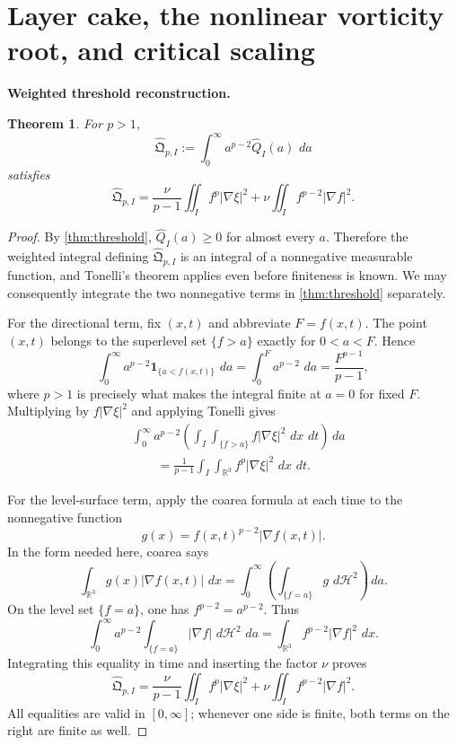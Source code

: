 \documentclass[11pt]{article}
\newtheorem{theorem}{Theorem}[section]
\theoremstyle{definition}\newtheorem{definition}[theorem]{Definition}
\theoremstyle{remark}\newtheorem{remark}[theorem]{Remark}
\newcommand{\R}{\mathbb R}\newcommand{\dd}{\,d}\newcommand{\HH}{\mathcal H}
\newcommand{\Qhat}{\widehat Q}\newcommand{\Qp}{\widehat{\mathfrak Q}}
\begin{document}
\section{Layer cake, the nonlinear vorticity root, and critical scaling}
\medskip
\noindent\textbf{Weighted threshold reconstruction.}
\begin{theorem}\label{thm:layercake}
For $p>1$,
\[
\Qp_{p,I}:=\int_0^\infty a^{p-2}\Qhat_I(a)\,\dd a
\]
satisfies
\[
\boxed{
\Qp_{p,I}=
\frac{\nu}{p-1}\iint_I f^p|\nabla\xi|^2
+\nu\iint_I f^{p-2}|\nabla f|^2.
}
\]
\end{theorem}
\begin{proof}
By \cref{thm:threshold}, $\Qhat_I(a)\ge0$ for almost every $a$.  Therefore
the weighted integral defining $\Qp_{p,I}$ is an integral of a nonnegative
measurable function, and Tonelli's theorem applies even before finiteness is
known.  We may consequently integrate the two nonnegative terms in
\cref{thm:threshold} separately.

For the directional term, fix $(x,t)$ and abbreviate $F=f(x,t)$.  The point
$(x,t)$ belongs to the superlevel set $\{f>a\}$ exactly for $0<a<F$.  Hence
\[
\int_0^\infty a^{p-2}\mathbf1_{\{a<f(x,t)\}}\,\dd a
=\int_0^F a^{p-2}\,\dd a
=\frac{F^{p-1}}{p-1},
\]
where $p>1$ is precisely what makes the integral finite at $a=0$ for fixed
$F$.  Multiplying by $f|\nabla\xi|^2$ and applying Tonelli gives
\[
\begin{aligned}
&\int_0^\infty a^{p-2}
\left(\int_I\int_{\{f>a\}}f|\nabla\xi|^2\,\dd x\,\dd t\right)\dd a\\
&\qquad=\frac1{p-1}\int_I\int_{\R^3}f^p|\nabla\xi|^2\,\dd x\,\dd t.
\end{aligned}
\]

For the level-surface term, apply the coarea formula at each time to the
nonnegative function
\[
g(x)=f(x,t)^{p-2}|\nabla f(x,t)|.
\]
In the form needed here, coarea says
\[
\int_{\R^3}g(x)|\nabla f(x,t)|\,\dd x
=
\int_0^\infty\left(
\int_{\{f=a\}}g\,\dd\HH^2\right)\dd a.
\]
On the level set $\{f=a\}$, one has $f^{p-2}=a^{p-2}$.  Thus
\[
\int_0^\infty a^{p-2}
\int_{\{f=a\}}|\nabla f|\,\dd\HH^2\,\dd a
=
\int_{\R^3}f^{p-2}|\nabla f|^2\,\dd x.
\]
Integrating this equality in time and inserting the factor $\nu$ proves
\[
\Qp_{p,I}=
\frac{\nu}{p-1}\iint_I f^p|\nabla\xi|^2
+\nu\iint_I f^{p-2}|\nabla f|^2.
\]
All equalities are valid in $[0,\infty]$; whenever one side is finite, both
terms on the right are finite as well.
\end{proof}
\end{document}
